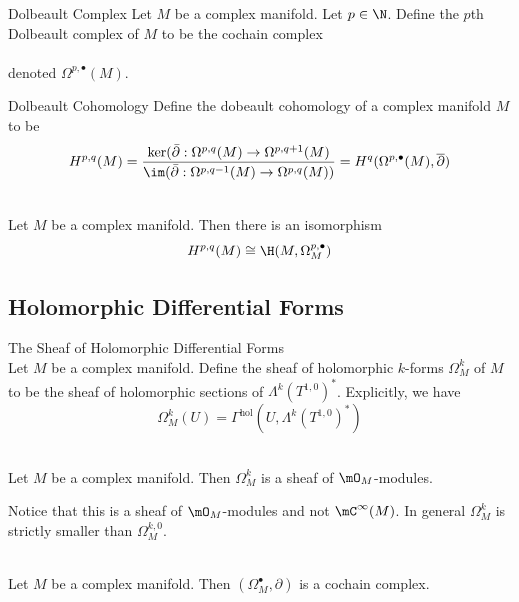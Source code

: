 \documentclass[a4paper]{article}
\begin{document}
\begin{defn}{Dolbeault Complex}{} Let $M$ be a complex manifold. Let $p\in\N$. Define the $p$th Dolbeault complex of $M$ to be the cochain complex \\
~\\
denoted $\Omega^{p,\bullet}(M)$. 
\end{defn}

\begin{defn}{Dolbeault Cohomology}{} Define the dobeault cohomology of a complex manifold $M$ to be $$H^{p,q}(M)=\frac{\ker(\bar{\partial}:\Omega^{p,q}(M)\to\Omega^{p,q+1}(M)}{\im(\bar{\partial}:\Omega^{p,q-1}(M)\to\Omega^{p,q}(M))}=H^q(\Omega^{p,\bullet}(M),\overline{\partial})$$
\end{defn}

\begin{lmm}{}{}\\
Let $M$ be a complex manifold. Then there is an isomorphism $$H^{p,q}(M)\cong\H(M,\Omega_M^{p,\bullet})$$
\end{lmm}

\subsection{Holomorphic Differential Forms}
\begin{defn}{The Sheaf of Holomorphic Differential Forms}{}\\
Let $M$ be a complex manifold. Define the sheaf of holomorphic $k$-forms $\Omega_M^k$ of $M$ to be the sheaf of holomorphic sections of $\Lambda^k(T^{1,0})^\ast$. Explicitly, we have $$\Omega_M^k(U)=\Gamma^\text{hol}(U,\Lambda^k(T^{1,0})^\ast)$$
\end{defn}

\begin{lmm}{}{}\\
Let $M$ be a complex manifold. Then $\Omega_M^k$ is a sheaf of $\mO_M$-modules. 
\end{lmm}

Notice that this is a sheaf of $\mO_M$-modules and not $\mC^\infty(M)$. In general $\Omega_M^k$ is strictly smaller than $\Omega_M^{k,0}$. 

\begin{lmm}{}{}\\
Let $M$ be a complex manifold. Then $(\Omega_M^\bullet,\partial)$ is a cochain complex. 
\end{lmm}
\end{document}
